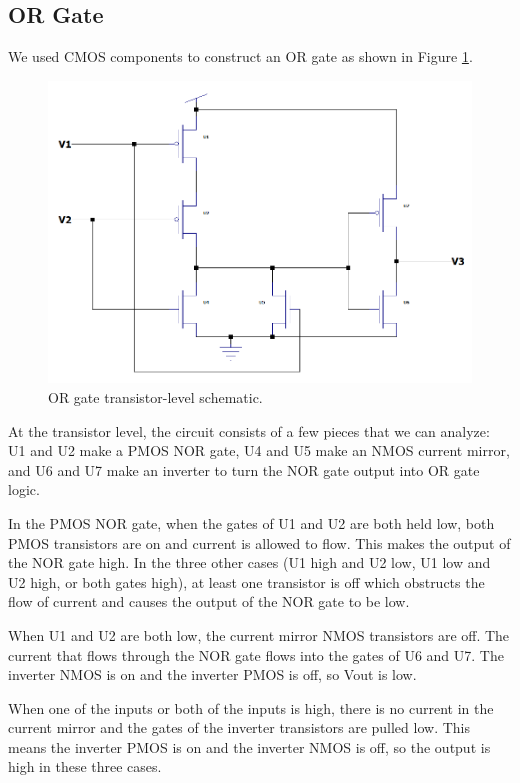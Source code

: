 \documentclass{article}
\begin{document}
\subsection{OR Gate}
We used CMOS components to construct an OR gate as shown in Figure \ref{fig:orgate}.

\begin{figure}[H]
  \begin{center}      
  \includegraphics[scale = 0.5]{images/orgate.PNG}
  \caption{OR gate transistor-level schematic.}   
  \label{fig:orgate}
  \end{center}
\end{figure}

At the transistor level, the circuit consists of a few pieces that we can analyze: U1 and U2 make a PMOS NOR gate, U4 and U5 make an NMOS current mirror, and U6 and U7 make an inverter to turn the NOR gate output into OR gate logic.

In the PMOS NOR gate, when the gates of U1 and U2 are both held low, both PMOS transistors are on and current is allowed to flow. This makes the output of the NOR gate high. In the three other cases (U1 high and U2 low, U1 low and U2 high, or both gates high), at least one transistor is off which obstructs the flow of current and causes the output of the NOR gate to be low. 

When U1 and U2 are both low, the current mirror NMOS transistors are off. The current that flows through the NOR gate flows into the gates of U6 and U7. The inverter NMOS is on and the inverter PMOS is off, so Vout is low. 

When one of the inputs or both of the inputs is high, there is no current in the current mirror and the gates of the inverter transistors are pulled low. This means the inverter PMOS is on and the inverter NMOS is off, so the output is high in these three cases.
\end{document}
